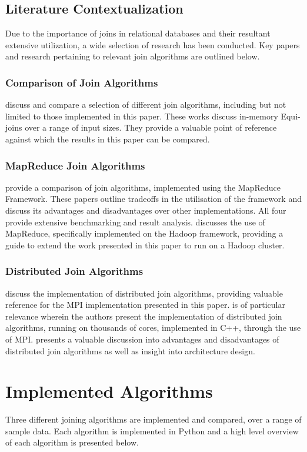 \documentclass[10.5 pt, conference]{IEEEtran}
\begin{document}
\subsection{Literature Contextualization} 
Due to the importance of joins in relational databases and their resultant extensive utilization, a wide selection of research has been conducted. Key papers and research pertaining to relevant join algorithms are outlined below.

\subsubsection{Comparison of Join Algorithms} 
\cite{Schuh2016,Helmer} discuss and compare a selection of different join algorithms, including but not limited to those implemented in this paper. These works discuss in-memory Equi-joins over a range of input sizes. They provide a valuable point of reference against which the results in this paper can be compared.

\subsubsection{MapReduce Join Algorithms} 
\cite{Bushan2007,Pigul,Blanas2010} provide a comparison of join algorithms, implemented using the MapReduce Framework. These papers outline tradeoffs in the utilisation of the framework and discuss its advantages and disadvantages over other implementations. All four provide extensive benchmarking and result analysis. \cite{Palla2009} discusses the use of MapReduce, specifically implemented on the Hadoop framework, providing a guide to extend the work presented in this paper to run on a Hadoop cluster.

\subsubsection{Distributed Join Algorithms} 
\cite{Barthels2017,Schneider1992,Yu1997} discuss the implementation of distributed join algorithms, providing valuable reference for the MPI implementation presented in this paper. \cite{Barthels2017} is of particular relevance wherein the authors present the implementation of distributed join algorithms, running on thousands of cores, implemented in C++, through the use of MPI. \cite{Barthels2017} presents a valuable discussion into advantages and disadvantages of distributed join algorithms as well as insight into architecture design.

\section{Implemented Algorithms}
Three different joining algorithms are implemented and compared, over a range of sample data. Each algorithm is implemented in Python and a high level overview of each algorithm is presented below.
\end{document}
